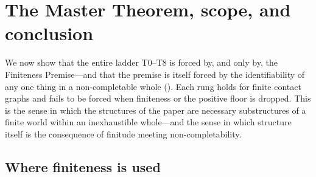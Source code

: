 
\section{The Master Theorem, scope, and conclusion}
\label{sec:master}

We now show that the entire ladder T0--T8 is forced by, and only by, the
Finiteness Premise---and that the premise is itself forced by the identifiability
of any one thing in a non-completable whole (). Each rung holds
for finite contact graphs and fails to be forced when finiteness or the positive
floor is dropped. This is the sense in which the structures of the paper are
necessary substructures of a finite world within an inexhaustible whole---and the
sense in which structure itself is the consequence of finitude meeting
non-completability.

\subsection{Where finiteness is used}

